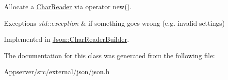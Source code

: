 Allocate a \hyperlink{classJson_1_1CharReader}{Char\+Reader} via operator new(). 


\begin{DoxyExceptions}{Exceptions}
{\em std\+::exception} & if something goes wrong (e.\+g. invalid settings) \\
\hline
\end{DoxyExceptions}


Implemented in \hyperlink{classJson_1_1CharReaderBuilder_a3a262fcc76c1eb8eebfd4718fb4e9722}{Json\+::\+Char\+Reader\+Builder}.



The documentation for this class was generated from the following file\+:\begin{DoxyCompactItemize}
\item 
Appserver/src/external/json/json.\+h\end{DoxyCompactItemize}
